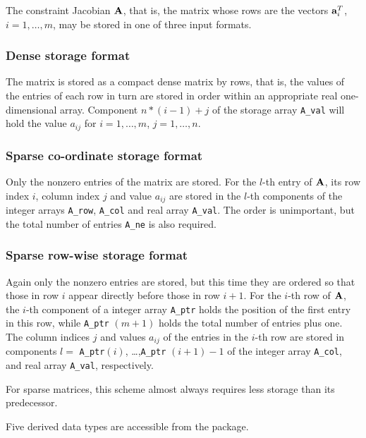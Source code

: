 \documentclass{galahad}
\begin{document}

\galmatrix
The constraint Jacobian ${\mathbf{A}}$, that is, the matrix 
whose rows are the vectors ${\mathbf{a}}_{i}^{T}$, $i = 1, \ldots , m$, 
may be stored in one of three input formats.

\subsubsection{Dense storage format}\label{dense}
The matrix is stored as a compact 
dense matrix by rows, that is, the values of the entries of each row in turn are
stored in order within an appropriate real one-dimensional array.
Component $n \ast (i-1) + j$ of the storage array {\tt A\_val} will hold the 
value $a_{ij}$ for $i = 1, \ldots , m$, $j = 1, \ldots , n$.

\subsubsection{Sparse co-ordinate storage format}\label{coordinate}
Only the nonzero entries of the matrix are stored. For the 
$l$-th entry of ${\mathbf{A}}$, its row index $i$, column index $j$ 
and value $a_{ij}$
are stored in the $l$-th components of the integer arrays {\tt A\_row}, 
{\tt A\_col} and real array {\tt A\_val}. 
The order is unimportant, but the total
number of entries {\tt A\_ne} is also required. 

\subsubsection{Sparse row-wise storage format}\label{rowwise}
Again only the nonzero entries are stored, but this time
they are ordered so that those in row $i$ appear directly before those
in row $i+1$. For the $i$-th row of ${\mathbf{A}}$, the $i$-th component of a 
integer array {\tt A\_ptr} holds the position of the first entry in this row,
while {\tt A\_ptr} $(m+1)$ holds the total number of entries plus one.
The column indices $j$ and values $a_{ij}$ of the entries in the $i$-th row 
are stored in components 
$l =$ {\tt A\_ptr}$(i)$, \ldots ,{\tt A\_ptr} $(i+1)-1$ of the 
integer array {\tt A\_col}, and real array {\tt A\_val}, respectively. 

For sparse matrices, this scheme almost always requires less storage than 
its predecessor.


\galtypes
Five derived data types are accessible from the package.
\end{document}
